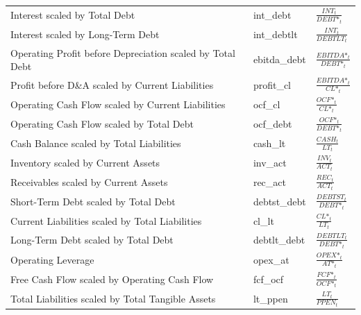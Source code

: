 \documentclass[12pt,title,fleqn]{article}
\begin{document}
{\begin{longtable}{@{\extracolsep{\fill}}|p{6cm}|l|p{8cm}|@{}}
	Interest scaled by Total Debt & int\_debt & $\frac{INT_t}{DEBT\mbox{*}_t}$\\
    
    Interest scaled by Long-Term Debt & int\_debtlt &$\frac{INT_t}{DEBTLT_t}$ \\
    
    Operating Profit before Depreciation scaled by Total Debt & ebitda\_debt &$\frac{EBITDA\mbox{*}_t}{DEBT\mbox{*}_t}$ \\

    Profit before D\&A scaled by Current Liabilities & profit\_cl &$\frac{EBITDA\mbox{*}_t}{CL\mbox{*}_t}$ \\
    
    Operating Cash Flow scaled by Current Liabilities & ocf\_cl &$\frac{OCF\mbox{*}_t}{CL\mbox{*}_t}$ \\
    
    Operating Cash Flow scaled by Total Debt & ocf\_debt &$\frac{OCF\mbox{*}_t}{DEBT\mbox{*}_t}$ \\
	
	Cash Balance scaled by Total Liabilities & cash\_lt &$\frac{CASH_t}{LT_t}$ \\
    
    Inventory scaled by Current Assets & inv\_act &$ \frac{INV_t}{ACT_t}$\\
    
    Receivables scaled by Current Assets & rec\_act &$\frac{REC_t}{ACT_t}$ \\
    
    Short-Term Debt scaled by Total Debt & debtst\_debt &$\frac{DEBTST_t}{DEBT\mbox{*}_t}$\\
    
    Current Liabilities scaled by Total Liabilities & cl\_lt &$\frac{CL\mbox{*}_t}{LT_t}$ \\
    
    Long-Term Debt scaled by Total Debt & debtlt\_debt &$\frac{DEBTLT_t}{DEBT\mbox{*}_t}$ \\
	
	Operating Leverage & opex\_at &$\frac{OPEX\mbox{*}_t}{AT\mbox{*}_t}$ \\
    
    Free Cash Flow scaled by Operating Cash Flow & fcf\_ocf &$ \frac{FCF\mbox{*}_t}{OCF\mbox{*}_t}$ \\
  
     Total Liabilities scaled by Total Tangible Assets & lt\_ppen &$\frac{LT_t}{PPEN_t}$\\  
    

\end{longtable}}
\end{document}
